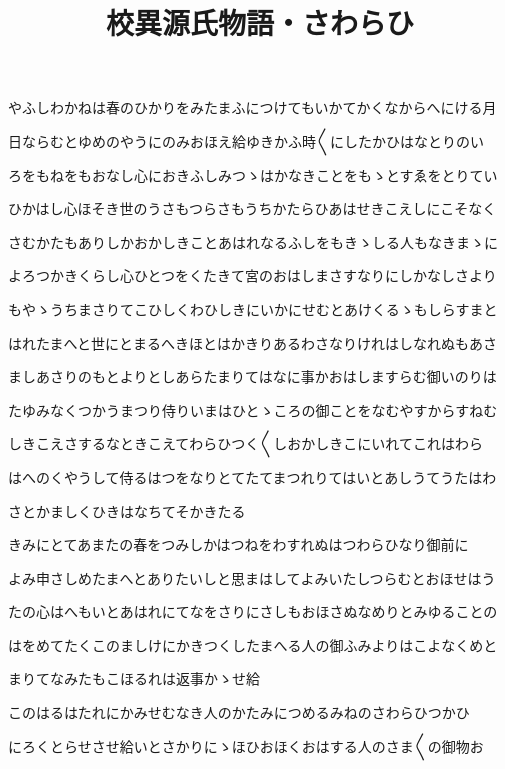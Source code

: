 \documentclass[a4paper,11pt,landscape]{ltjtarticle}
\title{校異源氏物語・さわらひ}
\date{}
\begin{document}
\maketitle

やふしわかねは春のひかりをみたまふにつけてもいかてかくなからへにける月
\par\medskip
日ならむとゆめのやうにのみおほえ給ゆきかふ時〱にしたかひはなとりのい
\par\medskip
ろをもねをもおなし心におきふしみつゝはかなきことをもゝとすゑをとりてい
\par\medskip
ひかはし心ほそき世のうさもつらさもうちかたらひあはせきこえしにこそなく
\par\medskip
さむかたもありしかおかしきことあはれなるふしをもきゝしる人もなきまゝに
\par\medskip
よろつかきくらし心ひとつをくたきて宮のおはしまさすなりにしかなしさより
\par\medskip
もやゝうちまさりてこひしくわひしきにいかにせむとあけくるゝもしらすまと
\par\medskip
はれたまへと世にとまるへきほとはかきりあるわさなりけれはしなれぬもあさ
\par\medskip
ましあさりのもとよりとしあらたまりてはなに事かおはしますらむ御いのりは
\par\medskip
たゆみなくつかうまつり侍りいまはひとゝころの御ことをなむやすからすねむ
\par\medskip
しきこえさするなときこえてわらひつく〱しおかしきこにいれてこれはわら
\par\medskip
はへのくやうして侍るはつをなりとてたてまつれりてはいとあしうてうたはわ
\par\medskip
さとかましくひきはなちてそかきたる
\par\medskip
きみにとてあまたの春をつみしかはつねをわすれぬはつわらひなり御前に
\par\medskip
よみ申さしめたまへとありたいしと思まはしてよみいたしつらむとおほせはう
\par\medskip
たの心はへもいとあはれにてなをさりにさしもおほさぬなめりとみゆることの
\par\medskip
はをめてたくこのましけにかきつくしたまへる人の御ふみよりはこよなくめと
\par\medskip
まりてなみたもこほるれは返事かゝせ給
\par\medskip
このはるはたれにかみせむなき人のかたみにつめるみねのさわらひつかひ
\par\medskip
にろくとらせさせ給いとさかりにゝほひおほくおはする人のさま〱の御物お
\par\medskip
\end{document}
